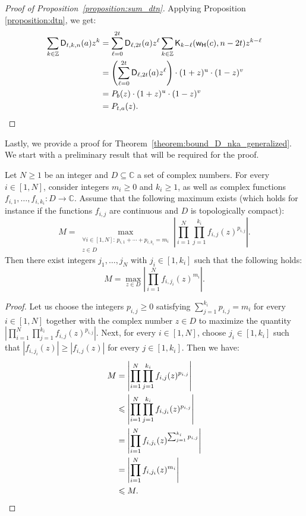 \documentclass[runningheads,orivec]{llncs}
\newcommand{\C}{\mathbb{C}}
\newcommand{\Dkna}[3]{\mathsf{D}_{#2,#1}(a)}
\newcommand{\Dtkna}[4]{\mathsf{D}_{#1,#2,#3}(#4)}
\newcommand{\kraw}[3]{\mathsf{K}_{#1}(#2,#3)}
\newcommand{\w}{\mathsf{w_H}}
\newcommand{\Z}{\mathbb{Z}}
\let\leq=\leqslant
\let\geq=\geqslant
\begin{document}
    \begin{proof}[Proof of Proposition~\ref{proposition:sum_dtn}]
        Applying Proposition \ref{proposition:dtn}, we get:
        \begin{align*}
            \sum_{k\in\Z}\Dtkna{t}{k}{n}{a}z^k&=\sum_{\ell=0}^{2t}\Dkna{2t}{\ell}{b}z^\ell\sum_{k\in\Z}\kraw{k-\ell}{\w(c)}{n-2t}z^{k-\ell}\\
            &=\left(\sum_{\ell=0}^{2t}\Dkna{2t}{\ell}{b}z^\ell\right)\cdot(1+z)^u\cdot(1-z)^v\\
            &=P_b(z)\cdot(1+z)^u\cdot(1-z)^v\\
            &=P_{t,a}(z).\qedhere
        \end{align*}
    \end{proof}
    
    Lastly, we provide a proof for Theorem~\ref{theorem:bound_D_nka_generalized}.
    We start with a preliminary result that will be required for the proof.
    
    \begin{lemma}\label{lemma:maximizing_args}
        Let $N\geq 1$ be an integer and $D\subseteq\C$ a set of complex numbers. For every $i\in[1,N]$, consider integers $m_i\geq 0$ and $k_i\geq 1$, as well as complex functions $f_{i,1},\dots,f_{i,k_i}:D\to\C$. Assume that the following maximum exists (which holds for instance if the functions $f_{i,j}$ are continuous and $D$ is topologically compact):
        \[
            M=\max_{\substack{\forall i\in[1,N]:\,p_{i,1}+\cdots+p_{i,k_i}=m_i\\z\in D}}\left|\prod_{i=1}^N\prod_{j=1}^{k_i}f_{i,j}(z)^{p_{i,j}}\right|.
        \]
        Then there exist integers $j_1,\dots,j_N$ with $j_i\in[1,k_i]$ such that the following holds:
        \[
            M=\max_{z\in D}\left|\prod_{i=1}^Nf_{i,j_i}(z)^{m_i}\right|.
        \]
    \end{lemma}
    
    \begin{proof}
        Let us choose the integers $p_{i,j}\geq 0$ satisfying $\sum_{j=1}^{k_i}p_{i,j}=m_i$ for every $i\in[1,N]$ together with the complex number $z\in D$ to maximize the quantity $\left|\prod_{i=1}^N\prod_{j=1}^{k_i}f_{i,j}(z)^{p_{i,j}}\right|$. Next, for every $i\in[1,N]$, choose $j_i\in[1,k_i]$ such that $|f_{i,j_i}(z)|\geq|f_{i,j}(z)|$ for every $j\in[1,k_i]$. Then we have:
        \begin{align*}
            M&=\left|\prod_{i=1}^N\prod_{j=1}^{k_i}f_{i,j}(z)^{p_{i,j}}\right|\\
    		&\leq\left|\prod_{i=1}^N\prod_{j=1}^{k_i}f_{i,j_i}(z)^{p_{i,j}}\right|\\
    		&=\left|\prod_{i=1}^Nf_{i,j_i}(z)^{\sum_{j=1}^{k_i}p_{i,j}}\right|\\
    		&=\left|\prod_{i=1}^Nf_{i,j_i}(z)^{m_i}\right|\\
    		&\leq M.\qedhere
        \end{align*}
    \end{proof}
    
\end{document}
